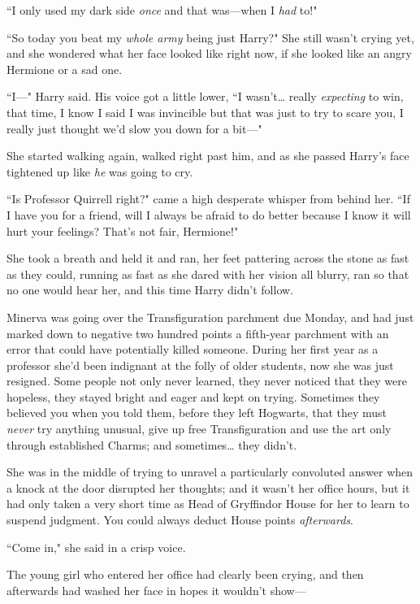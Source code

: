 ``I only used my dark side \emph{once} and that was---when I \emph{had} to!"

``So today you beat my \emph{whole army} being just Harry?" She still wasn't crying yet, and she wondered what her face looked like right now, if she looked like an angry Hermione or a sad one.

``I---" Harry said. His voice got a little lower, ``I wasn't{\ldots} really \emph{expecting} to win, that time, I know I said I was invincible but that was just to try to scare you, I really just thought we'd slow you down for a bit---"

She started walking again, walked right past him, and as she passed Harry's face tightened up like \emph{he} was going to cry.

``Is Professor Quirrell right?" came a high desperate whisper from behind her. ``If I have you for a friend, will I always be afraid to do better because I know it will hurt your feelings? That's not fair, Hermione!"

She took a breath and held it and ran, her feet pattering across the stone as fast as they could, running as fast as she dared with her vision all blurry, ran so that no one would hear her, and this time Harry didn't follow.

\later

Minerva was going over the Transfiguration parchment due Monday, and had just marked down to negative two hundred points a fifth-year parchment with an error that could have potentially killed someone. During her first year as a professor she'd been indignant at the folly of older students, now she was just resigned. Some people not only never learned, they never noticed that they were hopeless, they stayed bright and eager and kept on trying. Sometimes they believed you when you told them, before they left Hogwarts, that they must \emph{never} try anything unusual, give up free Transfiguration and use the art only through established Charms; and sometimes{\ldots} they didn't.

She was in the middle of trying to unravel a particularly convoluted answer when a knock at the door disrupted her thoughts; and it wasn't her office hours, but it had only taken a very short time as Head of Gryffindor House for her to learn to suspend judgment. You could always deduct House points \emph{afterwards}.

``Come in," she said in a crisp voice.

The young girl who entered her office had clearly been crying, and then afterwards had washed her face in hopes it wouldn't show---

